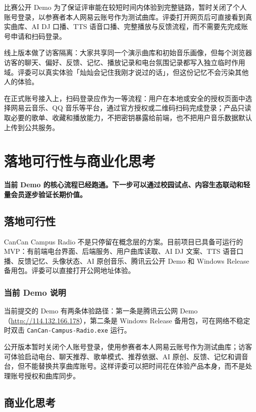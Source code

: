 \documentclass[UTF8,a4paper,11pt,fontset=windows]{ctexart}
\begin{document}
比赛公开 Demo 为了保证评审能在较短时间内体验到完整链路，暂时关闭了个人账号登录，以参赛者本人网易云账号作为测试曲库。评委打开网页后可直接看到真实曲库、AI DJ 口播、TTS 语音口播、完整播放与反馈流程，而不需要先完成账号申请和扫码登录。

线上版本做了访客隔离：大家共享同一个演示曲库和初始音乐画像，但每个浏览器访客的聊天、偏好、反馈、记忆、播放记录和电台氛围记录都写入独立临时作用域。评委可以真实体验「灿灿会记住我刚才说过的话」，但这份记忆不会污染其他人的体验。

在正式账号接入上，扫码登录应作为一等流程：用户在本地或安全的授权页面中选择网易云音乐、QQ 音乐等平台，通过官方授权或二维码扫码完成登录；产品只读取必要的歌单、收藏和播放能力，不把密钥暴露给前端，也不把用户音乐数据默认上传到公共服务。

\section{落地可行性与商业化思考}

\textbf{当前 Demo 的核心流程已经跑通。下一步可以通过校园试点、内容生态联动和轻量会员逐步验证长期价值。}

\subsection{落地可行性}

CanCan Campus Radio 不是只停留在概念层的方案。目前项目已具备可运行的 MVP：有前端电台界面、后端服务、用户曲库读取、AI DJ 文案、TTS 语音口播、反馈记忆、头像状态、AI 原创音乐、腾讯云公开 Demo 和 Windows Release 备用包。评委可以直接打开公网地址体验。

\subsubsection{当前 Demo 说明}

当前提交的 Demo 有两条体验路径：第一条是腾讯云公网 Demo（\href{http://114.132.166.178}{http://114.132.166.178}），第二条是 Windows Release 备用包，可在网络不稳定时双击 \texttt{CanCan-Campus-Radio.exe} 运行。

公开版本暂时关闭个人账号登录，使用参赛者本人网易云账号作为测试曲库；访客可体验启动电台、聊天推荐、歌单模式、推荐依据、AI 原创、反馈、记忆和调音台，但不能替换共享曲库账号。这样评委可以把时间花在体验产品本身，而不是处理账号授权和曲库同步。

\subsection{商业化思考}
\end{document}
